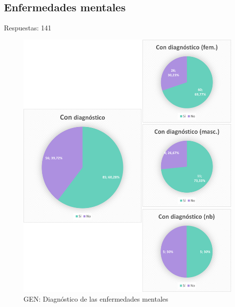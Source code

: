\documentclass[12pt, a4paper,twoside,titlepage]{book}
\begin{document}
\subsection{Enfermedades mentales}
Respuestas: 141

\begin{figure}
	\centering
	\includegraphics[width=1\linewidth]{ANEXO Gen/22AnexGENDiag}
	\caption{GEN: Diagnóstico de las enfermedades mentales}
	\label{fig:GENDiag}
\end{figure}
\end{document}
